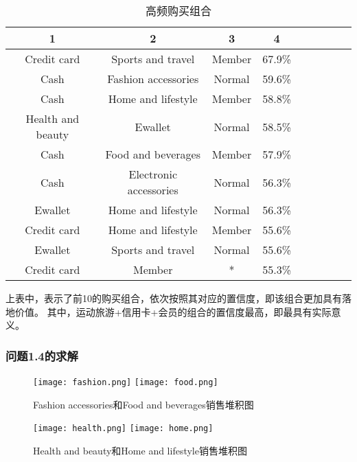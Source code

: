 \documentclass[withoutpreface,bwprint]{cumcmthesis}
\begin{document}
\begin{table}[H]
    \caption{高频购买组合}%
    \centering
    \fontsize{12}{14}\selectfont   
    \begin{tabular}{ccccccccc}
        \toprule[1.5pt]
        1 & 2 & 3 & 4 \\
        \midrule[1pt]
        Credit card & Sports and travel & Member & 67.9\% \\
        Cash & Fashion accessories & Normal & 59.6\% \\
        Cash & Home and lifestyle & Member & 58.8\% \\
        Health and beauty&Ewallet & Normal& 58.5\% \\
        Cash& Food and beverages& Member& 57.9\% \\
        Cash& Electronic accessories& Normal& 56.3\% \\
        Ewallet& Home and lifestyle& Normal& 56.3\% \\
        Credit card& Home and lifestyle& Member& 55.6\% \\
        Ewallet& Sports and travel& Normal& 55.6\% \\
        Credit card& Member& *& 55.3\% \\
        \bottomrule[1.5pt]
    \end{tabular}
\end{table}

\par
上表中，表示了前10的购买组合，依次按照其对应的置信度，即该组合更加具有落地价值。
其中，运动旅游+信用卡+会员的组合的置信度最高，即最具有实际意义。



\subsubsection {问题1.4的求解}

\begin{figure}[H]
\centering
{}
{\texttt{[image: fashion.png]}}
{\texttt{[image: food.png]}}
\caption{Fashion accessories和Food and beverages销售堆积图}\label{fig:双图}
\end{figure} 

\begin{figure}[H]
\centering
{}
{\texttt{[image: health.png]}}
{\texttt{[image: home.png]}}
\caption{Health and beauty和Home and lifestyle销售堆积图}\label{fig:双图}
\end{figure} 
\end{document}
